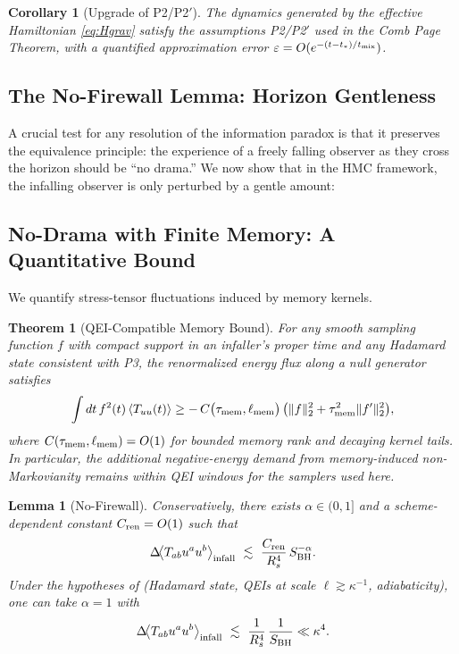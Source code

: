 \documentclass[a4paper,11pt]{article}
\newcommand{\HMC}{\textup{\textsc{HMC}}\xspace}
\theoremstyle{plain}
\newtheorem{theorem}{Theorem}
\newtheorem{lemma}{Lemma}
\newtheorem{corollary}{Corollary}
\theoremstyle{definition}
\theoremstyle{remark}
\begin{document}
\begin{corollary}[Upgrade of P2/P2$'$]
\label{cor:p2-upgrade}
The dynamics generated by the effective Hamiltonian \eqref{eq:Hgrav} satisfy the assumptions P2/P2$'$ used in the Comb Page Theorem, with a quantified approximation error $\varepsilon=O(e^{-(t-t_\ast)/t_{\rm mix}})$.
\end{corollary}

\subsection{The No-Firewall Lemma: Horizon Gentleness}
\label{sec:no_firewall}
A crucial test for any resolution of the information paradox is that it preserves the equivalence principle: the experience of a freely falling observer as they cross the horizon should be ``no drama.'' We now show that in the \HMC{} framework, the infalling observer is only perturbed by a gentle amount:

\subsection{No-Drama with Finite Memory: A Quantitative Bound}
We quantify stress-tensor fluctuations induced by memory kernels.

\begin{theorem}[QEI-Compatible Memory Bound]\label{thm:qei-memory}
For any smooth sampling function $f$ with compact support in an infaller's proper time and any Hadamard state consistent with P3, the renormalized energy flux along a null generator satisfies
\begin{align}
\int dt\, f^2(t)\,\langle T_{uu}(t)\rangle \ge -\,C\big(\tau_{\rm mem},\ell_{\rm mem}\big)\,\big(\|f\|_2^2 + \tau_{\rm mem}^2 \|f'\|_2^2\big),
\end{align}
where $C(\tau_{\rm mem},\ell_{\rm mem})=O(1)$ for bounded memory rank and decaying kernel tails. In particular, the additional negative-energy demand from memory-induced non-Markovianity remains within QEI windows for the samplers used here. 
\end{theorem}



\begin{lemma}[No-Firewall]\label{lem:nofirewall}\label{lem:firewall_bound}
Conservatively, there exists $\alpha\in(0,1]$ and a scheme-dependent constant $C_{\rm ren}=O(1)$ such that
\begin{equation}
    \Delta\!\big\langle T_{ab} u^a u^b \big\rangle_{\rm infall} \ \lesssim\ \frac{C_{\rm ren}}{R_s^4}\,S_{\rm BH}^{-\alpha}.
\end{equation}
Under the hypotheses of  (Hadamard state, QEIs at scale $\ell\!\gtrsim\!\kappa^{-1}$, adiabaticity),
one can take $\alpha=1$ with
\begin{equation}
    \Delta\!\big\langle T_{ab} u^a u^b \big\rangle_{\rm infall} \ \lesssim\ \frac{1}{R_s^4}\,\frac{1}{S_{\rm BH}} \ll \kappa^4.
    \label{eq:gentleness}
\end{equation}
\end{lemma}
\end{document}

